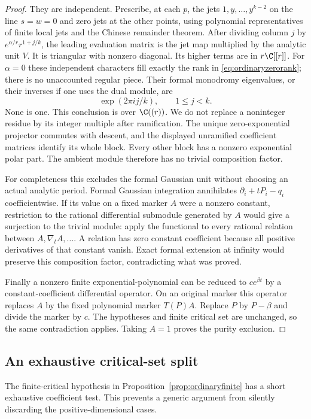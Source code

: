 \begin{proof}
They are independent. Prescribe, at each $p$, the jets
$1,y,\ldots,y^{k-2}$ on the line $s=w=0$ and zero jets at the
other points, using polynomial representatives of finite local
jets and the Chinese remainder theorem. After dividing column
$j$ by $e^{\alpha/r}r^{1+j/k}$, the leading evaluation matrix is
the jet map multiplied by the analytic unit $V$. It is triangular
with nonzero diagonal. Its higher terms are in $r\C[[r]]$.
For $\alpha=0$ these independent characters fill exactly the rank
in \eqref{eq:ordinaryzerorank}; there is no unaccounted regular
piece. Their formal monodromy eigenvalues, or their inverses if
one uses the dual module, are
\[
 \exp(2\pi i j/k),\qquad 1\le j<k.
\]
None is one. This conclusion is over $\C((r))$. We do not replace
a noninteger residue by its integer multiple after ramification.
The unique zero-exponential projector commutes with descent, and
the displayed unramified coefficient matrices identify its whole
block. Every other block has a nonzero exponential polar part.
The ambient module therefore has no trivial composition factor.

For completeness this excludes the formal Gaussian unit without
choosing an actual analytic period. Formal Gaussian integration
annihilates $\partial_i+tP_i-q_i$ coefficientwise. If its value
on a fixed marker $A$ were a nonzero constant, restriction to the
rational differential submodule generated by $A$ would give a
surjection to the trivial module: apply the functional to every
rational relation between $A,\nabla_tA,\ldots$. A relation has
zero constant coefficient because all positive derivatives of
that constant vanish. Exact formal extension at infinity would
preserve this composition factor, contradicting what was proved.

Finally a nonzero finite exponential-polynomial can be reduced
to $c e^{\beta t}$ by a constant-coefficient differential
operator. On an original marker this operator replaces $A$ by
the fixed polynomial marker $T(P)A$. Replace $P$ by $P-\beta$
and divide the marker by $c$. The hypotheses and finite critical
set are unchanged, so the same contradiction applies. Taking
$A=1$ proves the purity exclusion.
\end{proof}

\subsection{An exhaustive critical-set split}

The finite-critical hypothesis in Proposition~\ref{prop:ordinaryfinite}
has a short exhaustive coefficient test. This prevents a generic
argument from silently discarding the positive-dimensional cases.

